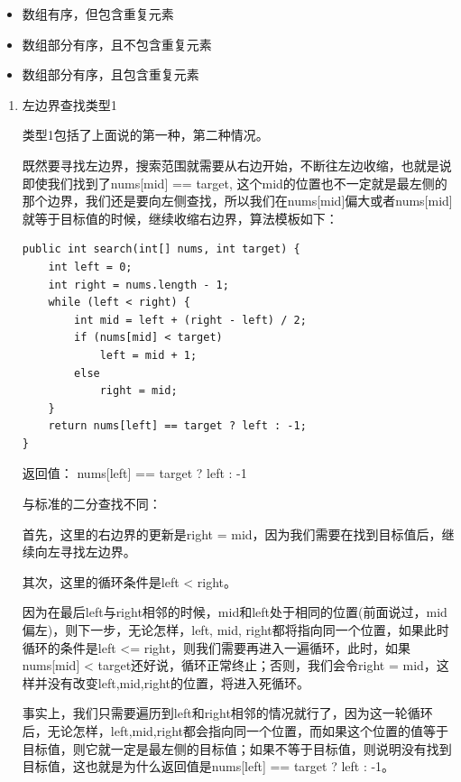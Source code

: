 \documentclass[9pt, b5paaper]{book}
\begin{document}
\begin{itemize}
\item 数组有序，但包含重复元素
\item 数组部分有序，且不包含重复元素
\item 数组部分有序，且包含重复元素
\end{itemize}
\begin{enumerate}
\item 左边界查找类型1
\label{sec-5-1-2-1}

类型1包括了上面说的第一种，第二种情况。

既然要寻找左边界，搜索范围就需要从右边开始，不断往左边收缩，也就是说即使我们找到了nums[mid] == target, 这个mid的位置也不一定就是最左侧的那个边界，我们还是要向左侧查找，所以我们在nums[mid]偏大或者nums[mid]就等于目标值的时候，继续收缩右边界，算法模板如下：
\begin{verbatim}
public int search(int[] nums, int target) {
    int left = 0;
    int right = nums.length - 1;
    while (left < right) {
        int mid = left + (right - left) / 2;
        if (nums[mid] < target) 
            left = mid + 1;
        else 
            right = mid;
    }
    return nums[left] == target ? left : -1;
}
\end{verbatim}

返回值： nums[left] == target ? left : -1

与标准的二分查找不同：

首先，这里的右边界的更新是right = mid，因为我们需要在找到目标值后，继续向左寻找左边界。

其次，这里的循环条件是left < right。

因为在最后left与right相邻的时候，mid和left处于相同的位置(前面说过，mid偏左)，则下一步，无论怎样，left, mid, right都将指向同一个位置，如果此时循环的条件是left <= right，则我们需要再进入一遍循环，此时，如果nums[mid] < target还好说，循环正常终止；否则，我们会令right = mid，这样并没有改变left,mid,right的位置，将进入死循环。

事实上，我们只需要遍历到left和right相邻的情况就行了，因为这一轮循环后，无论怎样，left,mid,right都会指向同一个位置，而如果这个位置的值等于目标值，则它就一定是最左侧的目标值；如果不等于目标值，则说明没有找到目标值，这也就是为什么返回值是nums[left] == target ? left : -1。


\end{enumerate}
\end{document}
